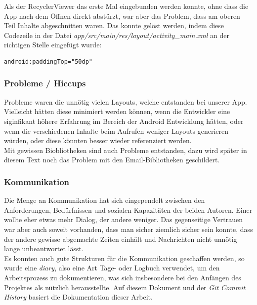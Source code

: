 \documentclass[a4paper,11pt]{article}
\begin{document}
Als der RecyclerViewer das erste Mal eingebunden werden konnte, ohne dass die App nach dem Öffnen direkt abstürzt, war aber das Problem, dass am oberen Teil Inhalte abgeschnitten waren. Das konnte gelöst werden, indem diese Codezeile in der Datei \textit{app/src/main/res/layout/activity\_main.xml} an der richtigen Stelle eingefügt wurde:

\lstset{language=XML}
\begin{lstlisting}
android:paddingTop="50dp"
\end{lstlisting}

\subsubsection{Probleme / Hiccups}
Probleme waren die unnötig vielen Layouts, welche entstanden bei unserer App. Vielleicht hätten diese minimiert werden können, wenn die Entwickler eine siginfikant höhere Erfahrung im Bereich der Android Entwicklung hätten, oder wenn die verschiedenen Inhalte beim Aufrufen weniger Layouts generieren würden, oder diese könnten besser wieder referenziert werden.\\

Mit gewissen Biobliotheken sind auch Probleme entstanden, dazu wird später in diesem Text noch das Problem mit den Email-Bibliotheken geschildert.

\subsubsection{Kommunikation}

Die Menge an Kommunikation hat sich eingependelt zwischen den Anforderungen, Bedürfnissen und sozialen Kapazitäten der beiden Autoren. Einer wollte eher etwas mehr Dialog, der andere weniger. Das gegenseitige Vertrauen war aber auch soweit vorhanden, dass man sicher ziemlich sicher sein konnte, dass der andere gewisse abgemachte Zeiten einhält und Nachrichten nicht unnötig lange unbeantwortet lässt.\\

Es konnten auch gute Strukturen für die Kommunikation geschaffen werden, so wurde eine \textit{diary}, also eine Art Tage- oder Logbuch verwendet, um den Arbeitsprozess zu dokumentieren, was sich insbesondere bei den Anfängen des Projektes als nützlich herausstellte. Auf diesem Dokument und der \textit{Git Commit History} basiert die Dokumentation dieser Arbeit.\\
\end{document}

